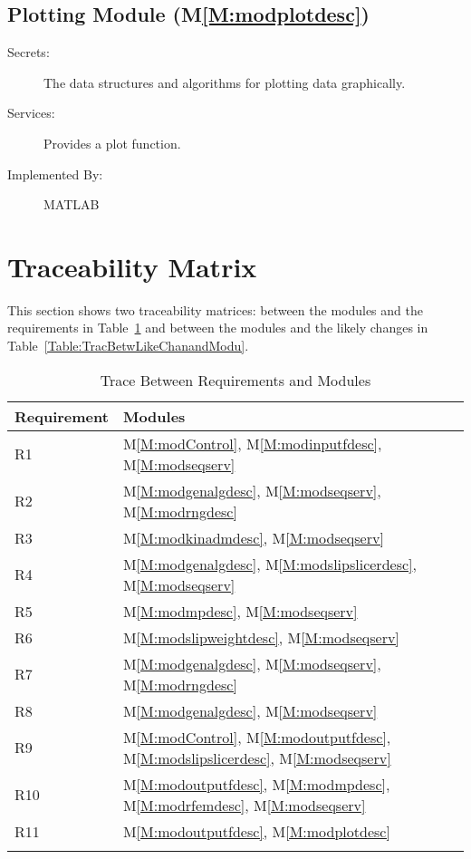 \documentclass[12pt]{article}
\begin{document}
\subsection{Plotting Module (M\ref{M:modplotdesc})}
\label{Sec:PlotModu()}
\begin{description}
\item[Secrets:]The data structures and algorithms for plotting data graphically.
\item[Services:]Provides a plot function.
\item[Implemented By:]MATLAB
\end{description}
\section{Traceability Matrix}
\label{Sec:TracMatr}
This section shows two traceability matrices: between the modules and the requirements in Table~\ref{Table:TracBetwRequandModu} and between the modules and the likely changes in Table~\ref{Table:TracBetwLikeChanandModu}.
\begin{longtable}{l l}
\toprule
Requirement & Modules
\\
\midrule
R1 & M\ref{M:modControl}, M\ref{M:modinputfdesc}, M\ref{M:modseqserv}
\\
R2 & M\ref{M:modgenalgdesc}, M\ref{M:modseqserv}, M\ref{M:modrngdesc}
\\
R3 & M\ref{M:modkinadmdesc}, M\ref{M:modseqserv}
\\
R4 & M\ref{M:modgenalgdesc}, M\ref{M:modslipslicerdesc}, M\ref{M:modseqserv}
\\
R5 & M\ref{M:modmpdesc}, M\ref{M:modseqserv}
\\
R6 & M\ref{M:modslipweightdesc}, M\ref{M:modseqserv}
\\
R7 & M\ref{M:modgenalgdesc}, M\ref{M:modseqserv}, M\ref{M:modrngdesc}
\\
R8 & M\ref{M:modgenalgdesc}, M\ref{M:modseqserv}
\\
R9 & M\ref{M:modControl}, M\ref{M:modoutputfdesc}, M\ref{M:modslipslicerdesc}, M\ref{M:modseqserv}
\\
R10 & M\ref{M:modoutputfdesc}, M\ref{M:modmpdesc}, M\ref{M:modrfemdesc}, M\ref{M:modseqserv}
\\
R11 & M\ref{M:modoutputfdesc}, M\ref{M:modplotdesc}
\\
\bottomrule
\caption{Trace Between Requirements and Modules}
\label{Table:TracBetwRequandModu}
\end{longtable}
\end{document}
